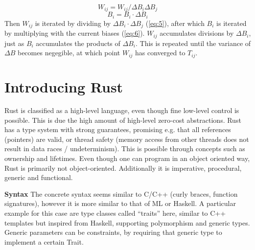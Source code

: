 \newpage
\begin{equation}\label{eq:5}
    W_{ij} = W_{ij} / \Delta B_i \Delta B_j
\end{equation}
\begin{equation}\label{eq:6}
    B_i = B_i \cdot \Delta B_i
\end{equation}
Then $W_{ij}$ is iterated by dividing by $\Delta B_i \cdot \Delta B_j$
(\eqref{eq:5}), after which $B_i$ is iterated by multiplying with the current
biases (\eqref{eq:6}). $W_{ij}$ accumulates divisions by $\Delta B_i$, just as
$B_i$ accumulates the products of $\Delta B_i$. This is repeated until the
variance of $\Delta B$ becomes negegible, at which point $W_{ij}$ has converged
to $T_{ij}$.






\section{Introducing Rust}\label{sec:Rust}

Rust is classified as a high-level language, even though fine low-level control
is possible. This is due the high amount of high-level zero-cost abstractions.
Rust has a type system with strong guarantees, promising e.g. that all
references (pointers) are valid, or thread safety (memory access from other
threads does not result in data races / undeterminism). This is possible
through concepts such as ownership and lifetimes. Even though one can program
in an object oriented way, Rust is primarily not object-oriented. Additionally
it is imperative, procedural, generic and functional.

\textbf{Syntax}\label{sec:syntax}
The concrete syntax seems similar to C/C++ (curly braces, function signatures),
however it is more similar to that of ML or Haskell. A particular example for
this case are type classes called ``traits'' here, similar to C++ templates but
inspired from Haskell, supporting polymorphism and generic types. Generic
parameters can be constraints, by requiring that generic type to implement a
certain Trait.

